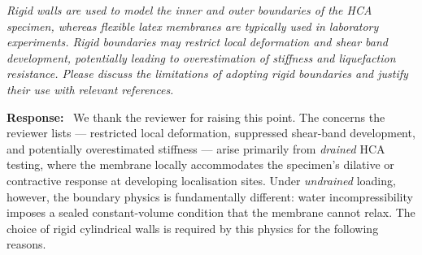 \documentclass[11pt,a4paper]{article}
\newenvironment{rcomment}
  {\begin{leftbar}\color{black!75}\itshape}
  {\end{leftbar}\vspace{0.3em}}
\newcommand{\response}{\par\noindent\textbf{Response:}\ \ignorespaces}
\begin{document}
\begin{rcomment}
Rigid walls are used to model the inner and outer boundaries of the HCA
specimen, whereas flexible latex membranes are typically used in laboratory
experiments. Rigid boundaries may restrict local deformation and shear band
development, potentially leading to overestimation of stiffness and
liquefaction resistance. Please discuss the limitations of adopting rigid
boundaries and justify their use with relevant references.
\end{rcomment}

\response
We thank the reviewer for raising this point. The concerns the
reviewer lists --- restricted local deformation, suppressed
shear-band development, and potentially overestimated stiffness ---
arise primarily from \emph{drained} HCA testing, where the membrane
locally accommodates the specimen's dilative or contractive response
at developing localisation sites. Under \emph{undrained} loading,
however, the boundary physics is fundamentally different: water
incompressibility imposes a sealed constant-volume condition that
the membrane cannot relax. The choice of rigid cylindrical walls is
required by this physics for the following reasons.
\end{document}
